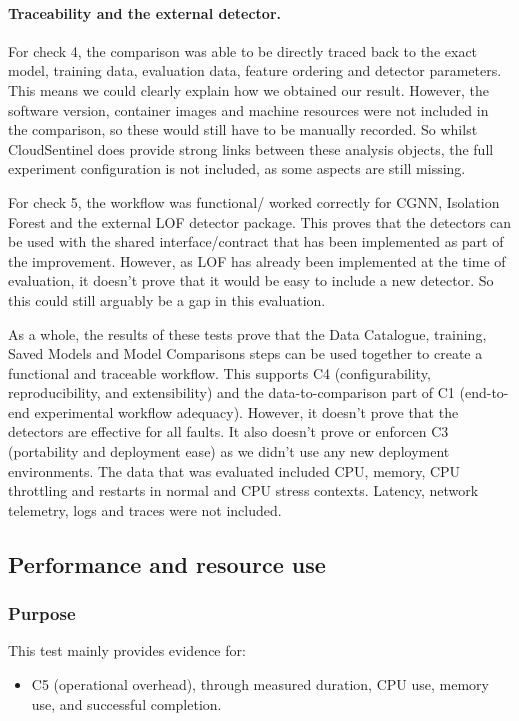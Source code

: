 \paragraph{Traceability and the external detector.}
For check 4, the comparison was able to be directly traced back to the exact model, training data, evaluation data, feature ordering and detector parameters. This means we could clearly explain how we obtained our result. However, the software version, container images and machine resources were not included in the comparison, so these would still have to be manually recorded. So whilst CloudSentinel does provide strong links between these analysis objects, the full experiment configuration is not included, as some aspects are still missing.

For check 5, the workflow was functional/ worked correctly for CGNN, Isolation Forest and the external LOF detector package. This proves that the detectors can be used with the shared interface/contract that has been implemented as part of the improvement. However, as LOF has already been implemented at the time of evaluation, it doesn’t prove that it would be easy to include a new detector. So  this could still arguably be a gap in this evaluation.

As a whole, the results of these tests prove that the Data Catalogue, training, Saved Models and Model Comparisons steps can be used together to create a functional and traceable workflow. This supports C4 (configurability, reproducibility, and extensibility) and the data-to-comparison part of C1 (end-to-end experimental workflow adequacy). However, it doesn’t prove that the detectors are effective for all faults. It also doesn’t prove or enforcen C3 (portability and deployment ease) as we didn’t use any new deployment environments. The data that was evaluated included CPU, memory, CPU throttling and restarts in normal and CPU stress contexts. Latency, network telemetry, logs and traces were not included.

\subsection{Performance and resource use}

\subsubsection{Purpose}
This test mainly provides evidence for:
\begin{itemize}
    \item C5 (operational overhead), through measured duration, CPU use, memory use, and successful completion.
\end{itemize}

